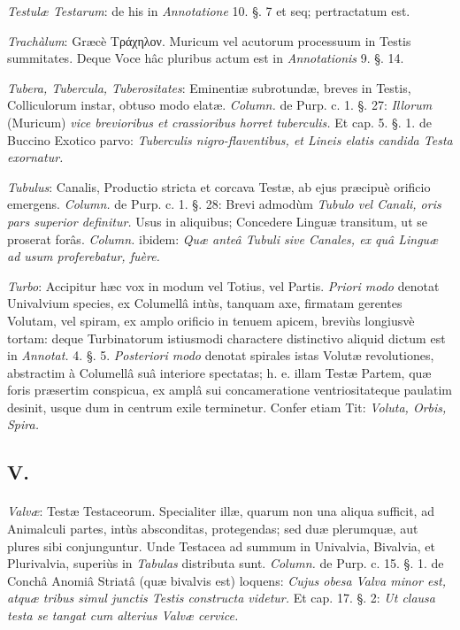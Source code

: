 \documentclass[a4paper, 11pt, oneside, polutonikogreek, german]{article}
\begin{document}
\emph{Testulæ Testarum}: de his in \emph{Annotatione} 10. §. 7 et seq; pertractatum est.

\emph{Trachàlum}: Græcè Τράχηλον. Muricum vel acutorum processuum in Testis summitates. Deque Voce hâc pluribus actum est in \emph{Annotationis} 9. §. 14.

\emph{Tubera, Tubercula, Tuberositates}: Eminentiæ subrotundæ, breves in Testis, Colliculorum instar, obtuso modo elatæ. \emph{Column.} de Purp. c. 1. §. 27: \emph{Illorum} (Muricum) \emph{vice brevioribus et crassioribus horret tuberculis.} Et cap. 5. §. 1. de Buccino Exotico parvo: \emph{Tuberculis nigro-flaventibus, et Lineis elatis candida Testa exornatur.}

\emph{Tubulus}: Canalis, Productio stricta et corcava Testæ, ab ejus præcipuè orificio emergens. \emph{Column.} de Purp. c. 1. §. 28: Brevi admodùm \emph{Tubulo vel Canali, oris pars superior definitur.} Usus in aliquibus; Concedere Linguæ transitum, ut se proserat forâs. \emph{Column.} ibidem: \emph{Quæ anteâ Tubuli sive Canales, ex quâ Linguæ ad usum proferebatur, fuère.}

\emph{Turbo}: Accipitur hæc vox in modum vel Totius, vel Partis. \emph{Priori modo} denotat Univalvium species, ex Columellâ intùs, tanquam axe, firmatam gerentes Volutam, vel spiram, ex amplo orificio in tenuem apicem, breviùs longiusvè tortam: deque Turbinatorum istiusmodi charactere distinctivo aliquid dictum est in \emph{Annotat.} 4. §. 5. \emph{Posteriori modo} denotat spirales istas Volutæ revolutiones, abstractim à Columellâ suâ interiore spectatas; h. e. illam Testæ Partem, quæ foris præsertim conspicua, ex amplâ sui concameratione ventriositateque paulatim desinit, usque dum in centrum exile terminetur. Confer etiam Tit: \emph{Voluta, Orbis, Spira.}

\subsection{V.}
\paragraph{}
\emph{Valvæ}: Testæ Testaceorum. Specialiter illæ, quarum non una aliqua sufficit, ad Animalculi partes, intùs absconditas, protegendas; sed duæ plerumquæ, aut plures sibi conjunguntur. Unde Testacea ad summum in Univalvia, Bivalvia, et Plurivalvia, superiùs in \emph{Tabulas} distributa sunt. \emph{Column.} de Purp. c. 15. §. 1. de Conchâ Anomiâ Striatâ (quæ bivalvis est) loquens: \emph{Cujus obesa Valva minor est, atquæ tribus simul junctis Testis constructa videtur.} Et cap. 17. §. 2: \emph{Ut clausa testa se tangat cum alterius Valvæ cervice.}
\end{document}
